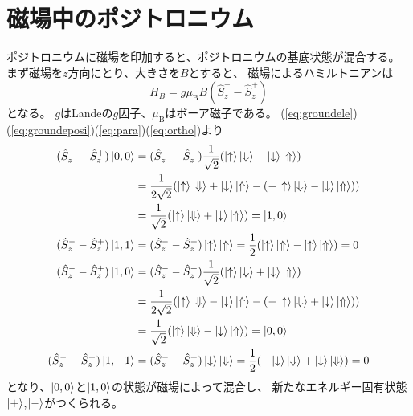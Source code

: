 \section{磁場中のポジトロニウム}
ポジトロニウムに磁場を印加すると、ポジトロニウムの基底状態が混合する。
まず磁場を$z$方向にとり、大きさを$B$とすると、
磁場によるハミルトニアンは
\begin{equation}
	\nonumber
	\hat{H}_{B} = g\mu_{\mathrm{B}}B(\hat{S}^{-}_{z} - \hat{S}^{+}_{z})
\end{equation}
となる。
$g$はLandeの$g$因子、$\mu_{\mathrm{B}}$はボーア磁子である。%
(\ref{eq:groundele})(\ref{eq:groundeposi})(\ref{eq:para})(\ref{eq:ortho})より
\begin{align}
	\nonumber
(\hat{S}^{-}_{z} - \hat{S}^{+}_{z})\ket{0,0} &= (\hat{S}^{-}_{z} - \hat{S}^{+}_{z})\frac{1}{\sqrt{2}} ( \ket{ \uparrow } \ket{ \Downarrow } - \ket{ \downarrow } \ket{ \Uparrow }) \notag \\
&= \frac{1}{2\sqrt{2}} ( \ket{ \uparrow } \ket{ \Downarrow } + \ket{ \downarrow } \ket{ \Uparrow } - ( - \ket{ \uparrow } \ket{ \Downarrow } - \ket{ \downarrow } \ket{ \Uparrow } )) \notag \\
&= \frac{1}{\sqrt{2}} ( \ket{ \uparrow } \ket{ \Downarrow } + \ket{ \downarrow } \ket{ \Uparrow }) = \ket{1,0} \\
(\hat{S}^{-}_{z} - \hat{S}^{+}_{z})\ket{1,1}
&= (\hat{S}^{-}_{z} - \hat{S}^{+}_{z})\ket{ \uparrow } \ket{ \Uparrow }
=\frac{1}{2}( \ket{ \uparrow } \ket{ \Uparrow } - \ket{ \uparrow } \ket{ \Uparrow } )
= 0 \\
(\hat{S}^{-}_{z} - \hat{S}^{+}_{z})\ket{1,0} &= (\hat{S}^{-}_{z} - \hat{S}^{+}_{z})\frac{1}{\sqrt{2}} ( \ket{ \uparrow } \ket{ \Downarrow } + \ket{ \downarrow } \ket{ \Uparrow }) \notag \\
&= \frac{1}{2\sqrt{2}} ( \ket{ \uparrow } \ket{ \Downarrow } - \ket{ \downarrow } \ket{ \Uparrow } - ( - \ket{ \uparrow } \ket{ \Downarrow } + \ket{ \downarrow } \ket{ \Uparrow } )) \notag \\
&= \frac{1}{\sqrt{2}} ( \ket{ \uparrow } \ket{ \Downarrow } - \ket{ \downarrow } \ket{ \Uparrow }) = \ket{0,0} \\
(\hat{S}^{-}_{z} - \hat{S}^{+}_{z})\ket{1,-1}
&= (\hat{S}^{-}_{z} - \hat{S}^{+}_{z})\ket{ \downarrow } \ket{ \Downarrow }
=\frac{1}{2}( - \ket{ \downarrow } \ket{ \Downarrow } + \ket{ \downarrow } \ket{ \Downarrow } )
= 0
\end{align}
となり、$\ket{0,0}$と$\ket{1,0}$の状態が磁場によって混合し、
新たなエネルギー固有状態$\ket{+}$,$\ket{-}$がつくられる。
